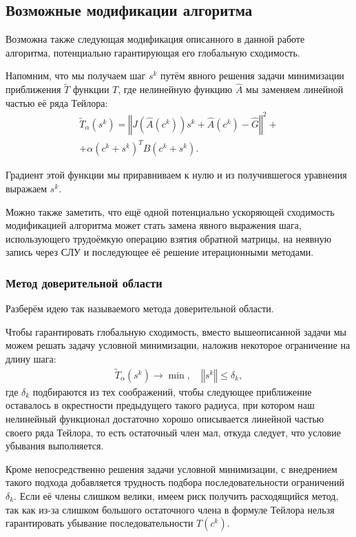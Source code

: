 \documentclass[a4paper,14pt]{extarticle}
\newcommand{\norm}[1]{\left\Vert #1 \right\Vert}
\begin{document}
    \subsection{Возможные модификации алгоритма}

    Возможна также следующая модификация описанного в данной работе алгоритма,
    потенциально гарантирующая его глобальную сходимость.

    Напомним, что мы получаем шаг $s^k$ путём явного решения задачи минимизации
    приближения $\widetilde{T}$ функции $T$, где нелинейную функцию $\hat{A}$
    мы заменяем линейной частью её ряда Тейлора:
    \begin{gather*}
        \widetilde{T}_{\alpha}(s^{k})
        = \norm{J(\hat{A}(c^k))s^{k} + \hat{A}(c^k) - \hat{G}}^2 + \\
        + \alpha  (c^k + s^{k})^{T} B (c^k + s^{k}).
    \end{gather*}

    Градиент этой функции мы приравниваем к нулю и из получившегося уравнения
    выражаем $s^k$.

    Можно также заметить, что ещё одной потенциально ускоряющей сходимость модификацией
    алгоритма может стать замена явного выражения шага, использующего
    трудоёмкую операцию взятия обратной матрицы, на неявную запись через СЛУ и
    последующее её решение итерационными методами.

    \subsubsection{Метод доверительной области}

    Разберём идею так называемого метода доверительной области.

    Чтобы гарантировать глобальную сходимость, вместо вышеописанной задачи мы
    можем решать задачу условной минимизации, наложив некоторое ограничение
    на длину шага:
    \begin{gather*}
        \widetilde{T}_{\alpha}(s^{k}) \to \min, \quad
        \norm{s^k} \leqslant \delta_k,
    \end{gather*}
    где $\delta_k$ подбираются из тех соображений, чтобы следующее приближение
    оставалось в окрестности предыдущего такого радиуса, при котором наш нелинейный
    функционал достаточно хорошо описывается линейной частью своего ряда Тейлора,
    то есть остаточный член мал, откуда следует, что условие убывания выполняется.

    Кроме непосредственно решения задачи условной минимизации, с внедрением
    такого подхода добавляется трудность подбора последовательности ограничений
    $\delta_k$.
    Если её члены слишком велики, имеем риск получить расходящийся метод,
    так как из-за слишком большого остаточного члена в формуле Тейлора
    нельзя гарантировать убывание последовательности $T(c^k)$.
\end{document}
